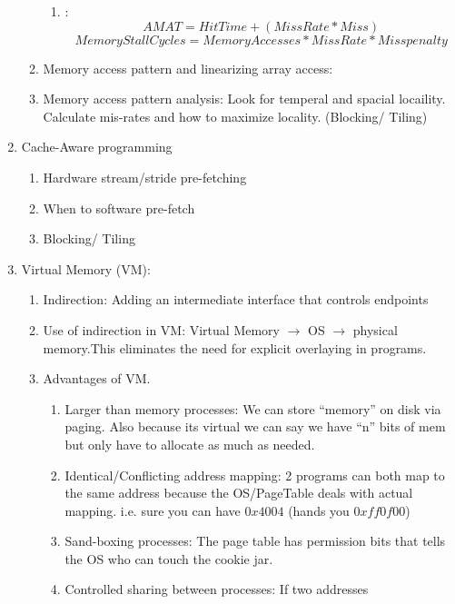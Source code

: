 \documentclass[12pt]{article}
\renewcommand{\=}[1]{\stackrel{#1}{=}} %
\theoremstyle{definition}
\theoremstyle{remark}
\begin{document}
\begin{enumerate}
\begin{enumerate}
\begin{enumerate}
      \item :
        \begin{equation}
          \label{eq: AMAT}
          AMAT = HitTime + (MissRate * Miss) 
        \end{equation}
        \begin{equation}
          MemoryStallCycles = MemoryAccesses * MissRate * Miss penalty
        \end{equation}
      \end{enumerate}
    \item Memory access pattern and linearizing array access: 
    \item Memory access pattern analysis: Look for temperal and
      spacial locaility. Calculate mis-rates and how to maximize
      locality. (Blocking/ Tiling)
    \end{enumerate}
  \item Cache-Aware programming
    \begin{enumerate}
    \item Hardware stream/stride pre-fetching
    \item When to software pre-fetch
    \item Blocking/ Tiling
    \end{enumerate}
  \item Virtual Memory (VM):
    \begin{enumerate}
    \item Indirection: Adding an intermediate interface that controls endpoints
    \item Use of indirection in VM: Virtual Memory $\rightarrow$ OS
      $\rightarrow$ physical memory.This eliminates the need for
      explicit overlaying in programs.
    \item Advantages of VM.
      \begin{enumerate}
      \item Larger than memory processes: We can store ``memory'' on
        disk via paging. Also because its virtual we can say we have
        ``n'' bits of mem but only have to allocate as much as needed.
      \item Identical/Conflicting address mapping: 2 programs can both
        map to the same address because the OS/PageTable deals with
        actual mapping. i.e. sure you can have $0x4004$ (hands you $0xff0f00$)
      \item Sand-boxing processes: The page table has permission bits
        that tells the OS who can touch the cookie jar.
      \item Controlled sharing between processes: If two addresses

\end{enumerate}
\end{enumerate}
\end{enumerate}
\end{document}
